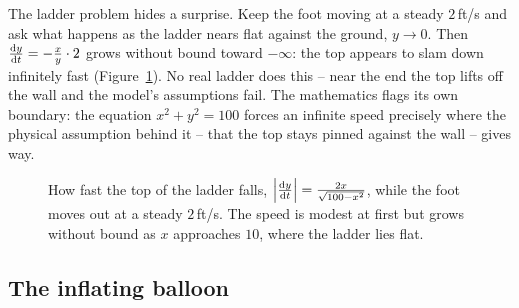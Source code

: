 \begin{aestheticbox}
The ladder problem hides a surprise. Keep the foot moving at a steady $2$\,ft/s and ask
what happens as the ladder nears flat against the ground, $y\to 0$. Then $\frac{\mathrm{d} y}{\mathrm{d} t} = -\tfrac{x}{y}
\cdot 2$ grows without bound toward $-\infty$: the top appears to slam down infinitely fast
(Figure~\ref{ch13:fig-ladder-speed}). No real
ladder does this -- near the end the top lifts off the wall and the model's assumptions fail. The
mathematics flags its own boundary: the equation $x^2+y^2=100$ forces an infinite speed precisely where
the physical assumption behind it -- that the top stays pinned against the wall -- gives way.
\end{aestheticbox}

\begin{figure}[htbp]
\centering
{}
\caption{How fast the top of the ladder falls, $\left|\frac{\mathrm{d} y}{\mathrm{d} t}\right| = \tfrac{2x}{\sqrt{100-x^2}}$,
while the foot moves out at a steady $2$\,ft/s. The speed is modest at first but grows without bound
as $x$ approaches $10$, where the ladder lies flat.}
\label{ch13:fig-ladder-speed}
\end{figure}

\subsection{The inflating balloon}

